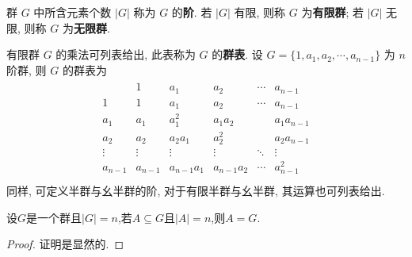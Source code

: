 \documentclass[../../main.tex]{subfiles}%
\begin{document}
\begin{definition}
群 \( G \) 中所含元素个数 \( |G| \) 称为 \( G \) 的\textbf{阶}. 若 \( |G| \) 有限, 则称 \( G \) 为\textbf{有限群}; 若 \( |G| \) 无限, 则称 \( G \) 为\textbf{无限群}.

有限群 \( G \) 的乘法可列表给出, 此表称为 \( G \) 的\textbf{群表}. 设 \( G = \{1, a_1, a_2, \cdots, a_{n-1}\} \) 为 \( n \) 阶群, 则 \( G \) 的群表为
\begin{align*}
\begin{array}{c|ccccc}
& 1 & a_1 & a_2 & \cdots & a_{n-1} \\
\hline
1 & 1 & a_1 & a_2 & \cdots & a_{n-1} \\
a_1 & a_1 & a_1^2 & a_1a_2 &  & a_1a_{n-1} \\
a_2 & a_2 & a_2a_1 & a_2^2 &  & a_2a_{n-1} \\
\vdots & \vdots & \vdots & \vdots & \ddots & \vdots \\
a_{n-1} & a_{n-1} & a_{n-1}a_1 & a_{n-1}a_2 & \cdots & a_{n-1}^2 \\
\end{array}
\end{align*}
同样, 可定义半群与幺半群的阶, 对于有限半群与幺半群, 其运算也可列表给出.
\end{definition}

\begin{proposition}
设$G$是一个群且$|G|=n$,若$A\subseteq G$且$|A|=n$,则$A=G.$
\end{proposition}
\begin{proof}
证明是显然的.
\end{proof}
\end{document}
